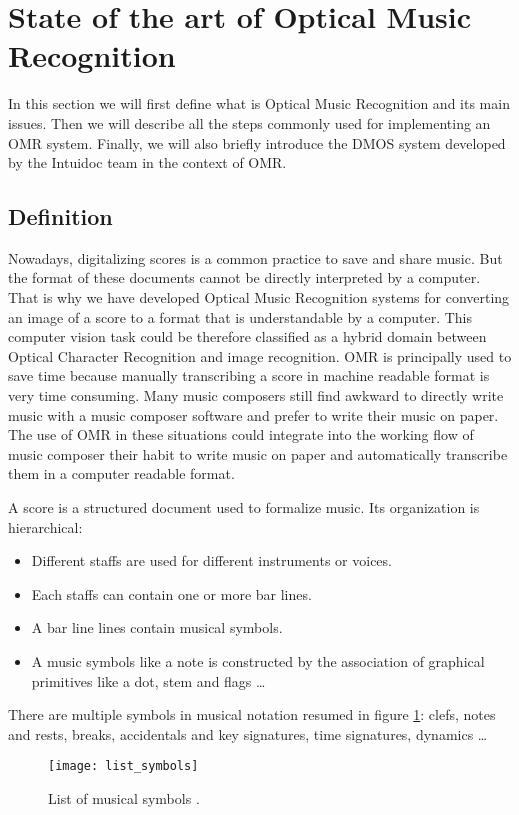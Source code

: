 \documentclass[11pt]{sdm}
\begin{document}
\section{State of the art of Optical Music Recognition}

In this section we will first define what is Optical Music Recognition and its main issues.
Then we will describe all the steps commonly used for implementing an OMR system.
Finally, we will also briefly introduce the DMOS system developed by the Intuidoc team in the context of OMR.

\subsection{Definition}

Nowadays, digitalizing scores is a common practice to save and share music.
But the format of these documents cannot be directly interpreted by a computer.
That is why we have developed Optical Music Recognition systems for converting an image of a score to a format that is understandable by a computer.
This computer vision task could be therefore classified as a hybrid domain between Optical Character Recognition and image recognition.
OMR is principally used to save time because manually transcribing a score in machine readable format is very time consuming.
Many music composers still find awkward to directly write music with a music composer software and prefer to write their music on paper.
The use of OMR in these situations could integrate into the working flow of music composer their habit to write music on paper and automatically transcribe them in a computer readable format.

A score is a structured document used to formalize music.
Its organization is hierarchical:
\begin{itemize}
  \item Different staffs are used for different instruments or voices.
  \item Each staffs can contain one or more bar lines.
  \item A bar line lines contain musical symbols.
  \item A music symbols like a note is constructed by the association of graphical primitives like a dot, stem and flags \ldots
\end{itemize}
There are multiple symbols in musical notation resumed in figure \ref{list_symbols}: clefs, notes and rests, breaks, accidentals and key signatures, time signatures, dynamics \ldots 
\begin{figure}[btp]
  \texttt{[image: list\_symbols]}
  \caption{\label{list_symbols} List of musical symbols \cite{fornes_analysis_2014}. }
\end{figure}
\end{document}
